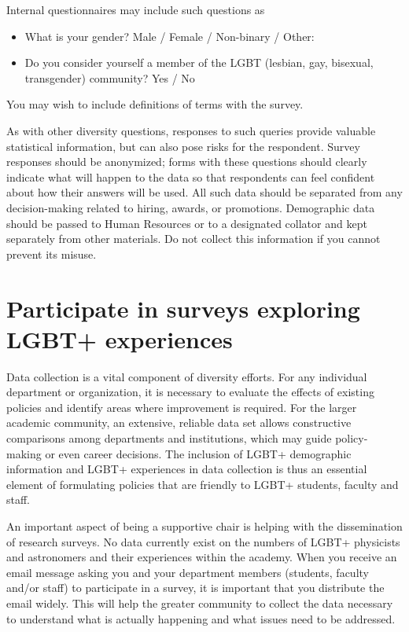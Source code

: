 Internal questionnaires may include such questions as
\begin{itemize}
	\item What is your gender? Male / Female / Non-binary / Other:\noindent\underline{\makebox[0.5in][l]{}}
	\item Do you consider yourself a member of the LGBT (lesbian, gay, bisexual, transgender) community? Yes / No
\end{itemize}

\noindent You may wish to include definitions of terms with the survey.

As with other diversity questions, responses to such queries provide valuable statistical information, but can also pose risks for the respondent. Survey responses should be anonymized; forms with these questions should clearly indicate what will happen to the data so that respondents can feel confident about how their answers will be used. All such data should be {separated from any decision-making} related to hiring, awards, or promotions. Demographic data should be passed to Human Resources or to a designated collator and kept separately from other materials. Do not collect this information if you cannot prevent its misuse.

\newpage
\section {Participate in surveys exploring LGBT+ experiences}
\label{surveys}
Data collection is a vital component of diversity efforts. For any individual department or organization, it is necessary to evaluate the effects of existing policies and identify areas where improvement is required. For the larger academic community, an extensive, reliable data set allows constructive comparisons among departments and institutions, which may guide policy-making or even career decisions. The inclusion of LGBT+ demographic information and LGBT+ experiences in data collection is thus an essential element of formulating policies that are friendly to LGBT+ students, faculty and staff.

An important aspect of being a supportive chair is helping with the dissemination of research surveys. No data currently exist on the numbers of LGBT+ physicists and astronomers and their experiences within the academy. When you receive an email message asking you and your department members (students, faculty and/or staff) to participate in a survey, it is important that you distribute the email widely. This will help the greater community to collect the data necessary to understand what is actually happening and what issues need to be addressed.


